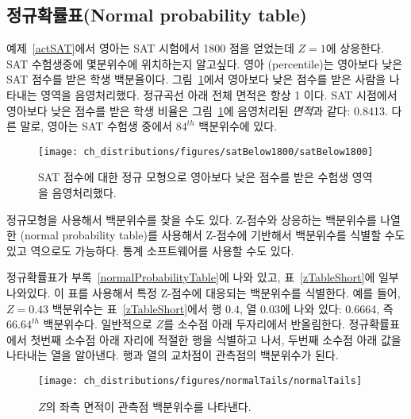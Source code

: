 \subsection{정규확률표(Normal probability table)}

\begin{example}{
예제~\ref{actSAT}에서 영아는 SAT 시험에서 1800 점을 얻었는데 $Z=1$에 상응한다. SAT 수험생중에 몇분위수에 위치하는지 알고싶다.}
영아 (percentile)는 영아보다 낮은 SAT 점수를 받은 학생 백분율이다. 그림~\ref{satBelow1800}에서 영아보다 낮은 점수를 받은 사람을 나타내는 영역을 음영처리했다. 정규곡선 아래 전체 면적은 항상 1 이다. SAT 시점에서 영아보다 낮은 점수를 받은 학생 비율은 그림~\ref{satBelow1800}에 음영처리된 \emph{면적}과 같다: 0.8413. 다른 말로, 영아는 SAT 수험생 중에서 $84^{th}$ 백분위수에 있다.
\end{example}

\begin{figure}[htb]
   \centering
   \texttt{[image: ch\_distributions/figures/satBelow1800/satBelow1800]}
   \caption{SAT 점수에 대한 정규 모형으로 영아보다 낮은 점수를 받은 수험생 영역을 음영처리했다.}
   \label{satBelow1800}
\end{figure}

정규모형을 사용해서 백분위수를 찾을 수도 있다. Z-점수와 상응하는 백분위수를 나열한 (normal probability table)를 사용해서 Z-점수에 기반해서 백분위수를 식별할 수도 있고 역으로도 가능하다. 통계 소프트웨어를 사용할 수도 있다.

정규확률표가 부록~\vref{normalProbabilityTable}에 나와 있고, 표~\ref{zTableShort}에 일부 나와있다. 이 표를 사용해서 특정 Z-점수에 대응되는 백분위수를 식별한다. 예를 들어, $Z=0.43$ 백분위수는 표~\ref{zTableShort}에서 행 $0.4$, 열 $0.03$에 나와 있다: 0.6664, 즉 $66.64^{th}$ 백분위수다. 일반적으로 $Z$를 소수점 아래 두자리에서 반올림한다. 정규확률표에서 첫번째 소수점 아래 자리에 적절한 행을 식별하고 나서, 두번째 소수점 아래 값을 나타내는 열을 알아낸다. 행과 열의 교차점이 관측점의 백분위수가 된다.

\begin{figure}
\centering
\texttt{[image: ch\_distributions/figures/normalTails/normalTails]}
\caption{ $Z$의 좌측 면적이 관측점 백분위수를 나타낸다.}
\label{normalTails}
\end{figure}

